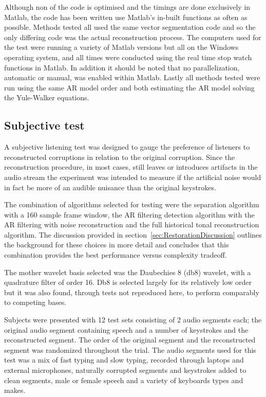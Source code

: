 Although non of the code is optimised and the timings are done exclusively in Matlab, the code has been written use Matlab's in-built functions as often as possible. Methods tested all used the same vector segmentation code and so the only differing code was the actual reconstruction process. The computers used for the test were running a variety of Matlab versions but all on the Windows operating system, and all times were conducted using the real time stop watch functions in Matlab. In addition it should be noted that no parallelization, automatic or manual, was enabled within Matlab. Lastly all methods tested were run using the same AR model order and both estimating the AR model solving the Yule-Walker equations.

\subsection{Subjective test}
A subjective listening test was designed to gauge the preference of listeners to reconstructed corruptions in relation to the original corruption. Since the reconstruction procedure, in most cases, still leaves or introduces artifacts in the audio stream the experiment was intended to measure if the artificial noise would in fact be more of an audible nuisance than the original keystrokes.

The combination of algorithms selected for testing were the separation algorithm with a 160 sample frame window, the AR filtering detection algorithm with the AR filtering with noise reconstruction and the full historical tonal reconstruction algorithm. The discussion provided in section~\ref{sec:RestorationDiscussion} outlines the background for these choices in more detail and concludes that this combination provides the best performance versus complexity tradeoff. 

The mother wavelet basis selected was the Daubechies 8 (db8) wavelet\cite{Daubechies1992}, with a quadrature filter of order 16. Db8 is selected largely for its relatively low order but it was also found, through tests not reproduced here, to perform comparably to competing bases.

Subjects were presented with 12 test sets consisting of 2 audio segments each; the original audio segment containing speech and a number of keystrokes and the reconstructed segment. The order of the original segment and the reconstructed segment was randomized throughout the trial. The audio segments used for this test was a mix of fast typing and slow typing, recorded through laptops and external microphones, naturally corrupted segments and keystrokes added to clean segments, male or female speech and a variety of keyboards types and makes.

